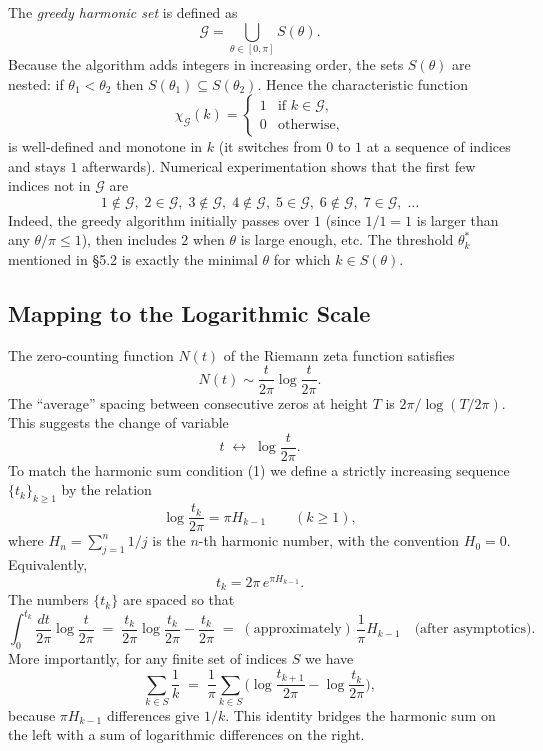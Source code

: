 The \emph{greedy harmonic set} is defined as
\[
\mathcal{G} = \bigcup_{\theta\in[0,\pi]} S(\theta) .
\]
Because the algorithm adds integers in increasing order, the sets \(S(\theta)\) are nested: if \(\theta_1<\theta_2\) then \(S(\theta_1)\subseteq S(\theta_2)\).  Hence the characteristic function
\[
\chi_{\mathcal{G}}(k) = \begin{cases}
1 & \text{if } k\in\mathcal{G},\\
0 & \text{otherwise},
\end{cases}
\]
is well‑defined and monotone in \(k\) (it switches from \(0\) to \(1\) at a sequence of indices and stays \(1\) afterwards).  Numerical experimentation shows that the first few indices not in \(\mathcal{G}\) are
\[
1\notin\mathcal{G},\; 2\in\mathcal{G},\; 3\notin\mathcal{G},\; 4\notin\mathcal{G},\; 5\in\mathcal{G},\; 6\notin\mathcal{G},\; 7\in\mathcal{G},\; \dots
\]
Indeed, the greedy algorithm initially passes over \(1\) (since \(1/1=1\) is larger than any \(\theta/\pi\le1\)), then includes \(2\) when \(\theta\) is large enough, etc.  The threshold \(\theta_k^*\) mentioned in §5.2 is exactly the minimal \(\theta\) for which \(k\in S(\theta)\).

\subsection{Mapping to the Logarithmic Scale}

The zero‑counting function \(N(t)\) of the Riemann zeta function satisfies
\[
N(t) \sim \frac{t}{2\pi}\log\frac{t}{2\pi} .
\]
The ``average'' spacing between consecutive zeros at height \(T\) is \(2\pi/\log(T/2\pi)\).  This suggests the change of variable
\[
t \;\longleftrightarrow\; \log\frac{t}{2\pi} .
\]
To match the harmonic sum condition (1) we define a strictly increasing sequence \(\{t_k\}_{k\ge1}\) by the relation
\[
\log\frac{t_k}{2\pi} = \pi H_{k-1} \qquad (k\ge1),
\tag{2}
\]
where \(H_n=\sum_{j=1}^n 1/j\) is the \(n\)-th harmonic number, with the convention \(H_0=0\).  Equivalently,
\[
t_k = 2\pi\, e^{\pi H_{k-1}} .
\]
The numbers \(\{t_k\}\) are spaced so that
\[
\int_{0}^{t_k} \frac{dt}{2\pi}\log\frac{t}{2\pi} \;=\; \frac{t_k}{2\pi}\log\frac{t_k}{2\pi} - \frac{t_k}{2\pi} \;=\; (\text{approximately})\, \frac{1}{\pi} H_{k-1} \quad\text{(after asymptotics)}.
\]
More importantly, for any finite set of indices \(S\) we have
\[
\sum_{k\in S} \frac{1}{k} \;=\; \frac{1}{\pi} \sum_{k\in S} \bigl( \log\frac{t_{k+1}}{2\pi} - \log\frac{t_k}{2\pi} \bigr),
\]
because \(\pi H_{k-1}\) differences give \(1/k\).  This identity bridges the harmonic sum on the left with a sum of logarithmic differences on the right.

